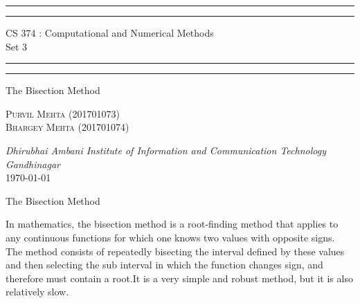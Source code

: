 \documentclass{article}
\begin{document}
\begin{titlepage}
	\centering 
	\scshape
	\vspace*{\baselineskip}
	\rule{\textwidth}{1.6pt}\vspace*{-\baselineskip}\vspace*{2pt}
	\rule{\textwidth}{0.4pt} 
	\vspace{0.75\baselineskip}
	
	{\Large CS 374 : Computational and Numerical Methods \\\vspace{0.75\baselineskip} Set 3}
	\vspace{0.75\baselineskip}
	
	\rule{\textwidth}{0.4pt}\vspace*{-\baselineskip}\vspace{3.2pt} 
	\rule{\textwidth}{1.6pt}
	
	\vspace{2\baselineskip}  
	The Bisection Method
	
	\vspace*{3\baselineskip}
	
	\vspace{0.5\baselineskip} %
	
	{\scshape\large Purvil Mehta (201701073) \\ Bhargey Mehta (201701074) \\} 
	
	\vspace{1\baselineskip} 
	
	\textit{Dhirubhai Ambani Institute of Information and Communication Technology \\ Gandhinagar\\} 
	\vspace*{2\baselineskip}
	\today


\end{titlepage}

\newpage
\tableofcontents
\newpage
{\Large{\begin{center}The Bisection Method\end{center}}}

In mathematics, the bisection method is a root-finding method that applies to any continuous functions for which one knows two values with opposite signs. The method consists of repeatedly bisecting the interval defined by these values and then selecting the sub interval in which the function changes sign, and therefore must contain a root.It is a very simple and robust method, but it is also relatively slow.
\end{document}
